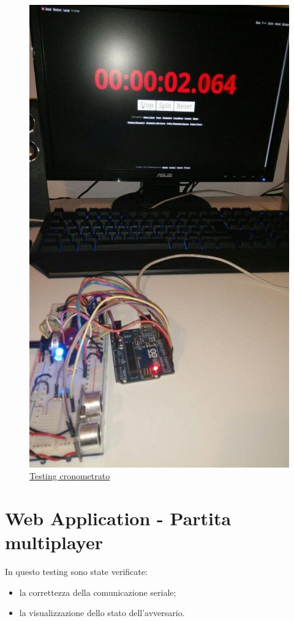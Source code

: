 \begin{figure}[!ht]
	\centering
	\includegraphics[scale=.25]{img/testing/testing1.jpg}
	\caption{\href{https://youtu.be/X0QOKkfVF4Y}{Testing cronometrato}}
\end{figure}

\clearpage
\section{Web Application - Partita multiplayer}
In questo testing sono state verificate:
\begin{itemize}
	\item la correttezza della comunicazione seriale;
	\item la visualizzazione dello stato dell'avversario.
\end{itemize}

